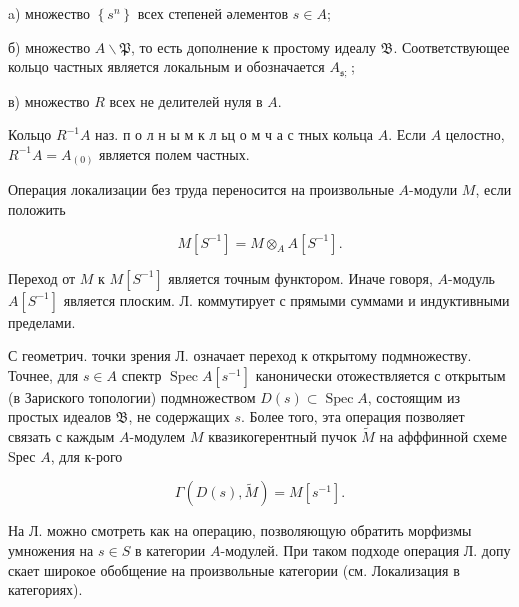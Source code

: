 \documentclass[10pt]{article}
\begin{document}
a) множество $\left\{s^{n}\right\}$ всех степеней әлементов $s \in A$;



б) множество $A \backslash \mathfrak{P}$, то есть дополнение к простому идеалу $\mathfrak{B}$. Соответствующее кольцо частных является локальным и обозначается $A_{\mathfrak{s} \text {; }}$;



в) множество $R$ всех не делителей нуля в $A$.



Кольцо $R^{-1} A$ наз. п о л н ы м к л ьц о м ч а с тных кольца $A$. Если $A$ целостно, $R^{-1} A=A_{(0)}$ является полем частных.



Операция локализации без труда переносится на произвольные $A$-модули $M$, если положить



\[

M\left[S^{-1}\right]=M \otimes_{A} A\left[S^{-1}\right] .

\]



Переход от $M$ к $M\left[S^{-1}\right]$ является точным функтором. Иначе говоря, $A$-модуль $A\left[S^{-1}\right]$ является плоским. Л. коммутирует с прямыми суммами и индуктивными пределами.



С геометрич. точки зрения Л. означает переход к открытому подмножеству. Точнее, для $s \in A$ спектр $\operatorname{Spec} A\left[s^{-1}\right]$ канонически отожествляется с открытым (в Зариского топологии) подмножеством $D(s) \subset \operatorname{Spec} A$, состоящим из простых идеалов $\mathfrak{B}$, не содержащих $s$. Более того, эта операция позволяет связать с каждым $A$-модулем $M$ квазикогерентный пучок $\widetilde{M}$ на афффинной схеме Sрес $A$, для к-рого



\[

\Gamma(D(s), \tilde{M})=M\left[s^{-1}\right] .

\]



На Л. можно смотреть как на операцию, позволяющую обратить морфизмы умножения на $s \in S$ в категории $A$-модулей. При таком подходе операция Л. допу скает широкое обобщение на произвольные категории (см. Локализация в категориях).
\end{document}
